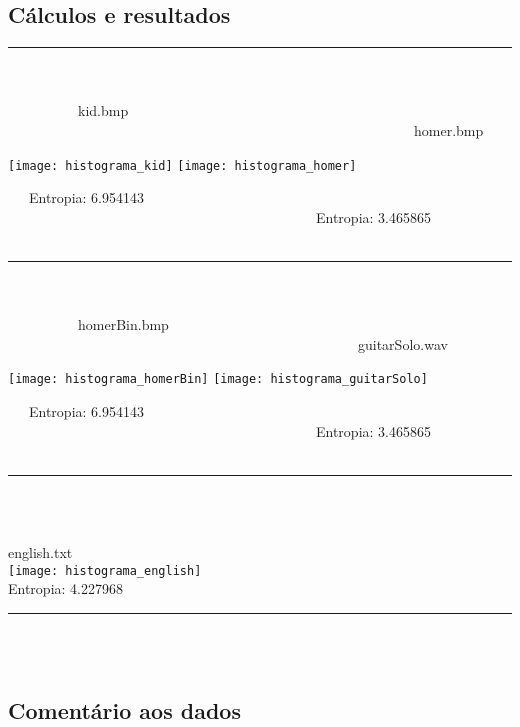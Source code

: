 \documentclass{article}
\begin{document}
\subsection{Cálculos e resultados}
\rule{12.5cm}{0.4pt}\\\\
\ \ \ \ \ \ \ \ \ \ kid.bmp  \ \ \ \ \ \ \ \ \ \ \ \ \ \ \ \ \ \ \ \ \ \ \ \ \ \ \ \ \ \ \ \ \ \ \ \ \ \ \ \ \ \ \ \ \ \ \ \ \ \ \ \ \ \ \ \ \ \  homer.bmp\\
\centerline{\texttt{[image: histograma\_kid]} \texttt{[image: histograma\_homer]}}
\ \ \ Entropia: 6.954143  \ \ \ \ \ \ \ \ \ \ \ \ \ \ \ \ \ \ \ \ \ \ \ \ \ \ \ \ \ \ \ \ \ \ \ \ \ \ \ \ \ \ \ \  Entropia: 3.465865\\\\
\rule{12.5cm}{0.4pt}\\\\
\ \ \ \ \ \ \ \ \ \ homerBin.bmp  \ \ \ \ \ \ \ \ \ \ \ \ \ \ \ \ \ \ \ \ \ \ \ \ \ \ \ \ \ \ \ \ \ \ \ \ \ \ \ \ \ \ \ \ \ \ \ \ \ \  guitarSolo.wav\\
\centerline{\texttt{[image: histograma\_homerBin]} \texttt{[image: histograma\_guitarSolo]}}
\ \ \ Entropia: 6.954143  \ \ \ \ \ \ \ \ \ \ \ \ \ \ \ \ \ \ \ \ \ \ \ \ \ \ \ \ \ \ \ \ \ \ \ \ \ \ \ \ \ \ \ \  Entropia: 3.465865\\\\
\rule{12.5cm}{0.4pt}\\\\
\begin{center}
english.txt\\
\texttt{[image: histograma\_english]}\\
Entropia: 4.227968
\end{center}
\rule{12.5cm}{0.4pt}\\\\

\subsection{Comentário aos dados}
\end{document}
